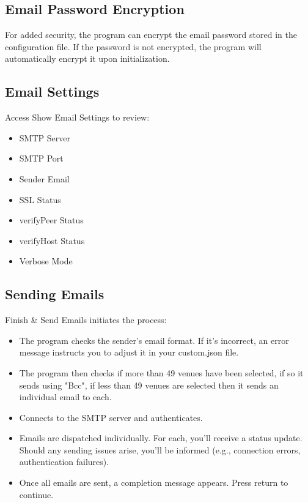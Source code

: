 \documentclass{article}
\begin{document}
	\subsection*{Email Password Encryption}
	For added security, the program can encrypt the email password stored in the configuration file. If the password is not encrypted, the program will automatically encrypt it upon initialization. 
	
	\subsection*{Email Settings}
	Access Show Email Settings to review:
	\begin{itemize}
		\item SMTP Server
		\item SMTP Port
		\item Sender Email
		\item SSL Status
		\item verifyPeer Status
		\item verifyHost Status
		\item Verbose Mode
	\end{itemize}

	\subsection*{Sending Emails}
	Finish \& Send Emails initiates the process:
	\begin{itemize}
		\item The program checks the sender's email format. If it's incorrect, an error message instructs you to adjust it in your custom.json file.
		\item The program then checks if more than 49 venues have been selected, if so it sends using "Bcc", if less than 49 venues are selected then it sends an individual email to each.
		\item Connects to the SMTP server and authenticates.
		\item Emails are dispatched individually. For each, you'll receive a status update. Should any sending issues arise, you'll be informed (e.g., connection errors, authentication failures).
		\item Once all emails are sent, a completion message appears. Press return to continue.
	\end{itemize}
	
\end{document}
